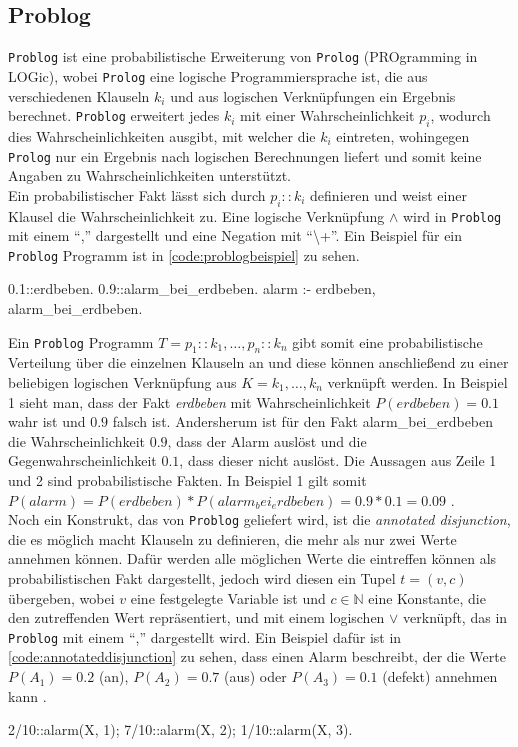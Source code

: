\documentclass[german,version-2020-11]{uzl-thesis}
\begin{document}
\subsection{Problog}
\texttt{Problog} ist eine probabilistische Erweiterung von \texttt{Prolog} (PROgramming in LOGic), wobei \texttt{Prolog} eine logische Programmiersprache ist, die aus verschiedenen Klauseln $k_i$ und aus logischen Verknüpfungen ein Ergebnis berechnet. \texttt{Problog} erweitert jedes $k_i$ mit einer Wahrscheinlichkeit $p_i$, wodurch dies Wahrscheinlichkeiten ausgibt, mit welcher die $k_i$ eintreten, wohingegen \texttt{Prolog} nur ein Ergebnis nach logischen Berechnungen liefert und somit keine Angaben zu Wahrscheinlichkeiten unterstützt. \\  Ein probabilistischer Fakt lässt sich durch $p_i :: k_i$ definieren und weist einer Klausel die Wahrscheinlichkeit zu. Eine logische Verknüpfung $\land$ wird in \texttt{Problog} mit einem \enquote{,} dargestellt und eine Negation mit  \enquote{\textbackslash+}. Ein Beispiel für ein \texttt{Problog} Programm ist in \autoref{code:problogbeispiel} zu sehen.
\begin{Pseudocode}[caption={\texttt{Problog} Programm-Beispiel}, label={code:problogbeispiel}, numbers=left]
0.1::erdbeben.
0.9::alarm_bei_erdbeben.
alarm :- erdbeben, alarm_bei_erdbeben.
\end{Pseudocode} 
Ein \texttt{Problog} Programm $T = {p_1 :: k_1, \dots, p_n :: k_n}$ gibt somit eine probabilistische Verteilung über die einzelnen Klauseln an und diese können anschließend zu einer beliebigen logischen Verknüpfung aus $K = {k_1 , \dots , k_n}$ verknüpft werden. In Beispiel 1 sieht man, dass der Fakt \textit{erdbeben} mit Wahrscheinlichkeit $ P(erdbeben) = 0.1$ wahr ist und $0.9$ falsch ist. Andersherum ist für den Fakt alarm\_bei\_erdbeben  die Wahrscheinlichkeit $0.9$, dass der Alarm auslöst und die Gegenwahrscheinlichkeit $0.1$, dass dieser nicht auslöst. Die Aussagen aus Zeile 1 und 2 sind probabilistische Fakten.  In Beispiel 1 gilt somit $P(alarm) = P(erdbeben) * P(alarm_bei_erdbeben) = 0.9 * 0.1 = 0.09$ \cite{4}\cite{5}. \\ 
Noch ein Konstrukt, das von \texttt{Problog} geliefert wird, ist die \textit{annotated disjunction}, die es möglich macht Klauseln zu definieren, die mehr als nur zwei Werte annehmen können. Dafür werden alle möglichen Werte die eintreffen können als probabilistischen Fakt dargestellt, jedoch wird diesen ein Tupel $t = (v,c) $ übergeben, wobei $v$ eine festgelegte Variable ist und $c \in \mathbb{N}$ eine Konstante, die den zutreffenden Wert repräsentiert, und  mit einem logischen $\lor$ verknüpft, das in \texttt{Problog} mit einem \enquote{,} dargestellt wird. Ein Beispiel dafür ist in \autoref{code:annotateddisjunction} zu sehen, dass einen Alarm beschreibt, der die Werte $P(A_1) = 0.2$ (an), $P(A_2) = 0.7$ (aus) oder $P(A_3) = 0.1$ (defekt) annehmen kann \cite{5}.
\begin{Pseudocode}[caption={\texttt{Problog}-Beispiel \textit{annotated disjunction}}, label={code:annotateddisjunction}, numbers=left]
2/10::alarm(X, 1); 7/10::alarm(X, 2); 1/10::alarm(X, 3).
\end{Pseudocode}
\end{document}
